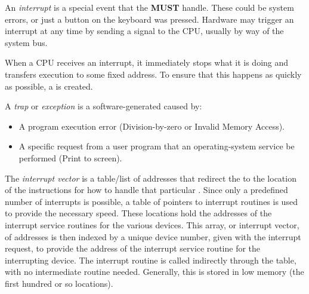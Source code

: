 \begin{definition}[Interrupt]\label{def:Interrupt}
  An \emph{interrupt} is a special event that the  \textbf{MUST} handle.
  These could be system errors, or just a button on the keyboard was pressed.
  Hardware may trigger an interrupt at any time by sending a signal to the CPU, usually by way of the system bus.

  When a CPU receives an interrupt, it immediately stops what it is doing and transfers execution to some fixed address.
  To ensure that this happens as quickly as possible, a  is created.
\end{definition}

\begin{definition}[Trap]\label{def:Trap}
  A \emph{trap} or \emph{exception} is a software-generated  caused by:
  \begin{itemize}[noitemsep]
  \item A program execution error (Division-by-zero or Invalid Memory Access).
  \item A specific request from a user program that an operating-system service be performed (Print to screen).
  \end{itemize}
\end{definition}

\begin{definition}\label{def:Interrupt_Vector}
  The \emph{interrupt vector} is a table/list of addresses that redirect the  to the location of the instructions for how to handle that particular .
  Since only a predefined number of interrupts is possible, a table of pointers to interrupt routines is used to provide the necessary speed.
  These locations hold the addresses of the interrupt service routines for the various devices.
  This array, or interrupt vector, of addresses is then indexed by a unique device number, given with the interrupt request, to provide the address of the interrupt service routine for the interrupting device.
  The interrupt routine is called indirectly through the table, with no intermediate routine needed.
  Generally, this is stored in low memory (the first hundred or so locations).
\end{definition}

